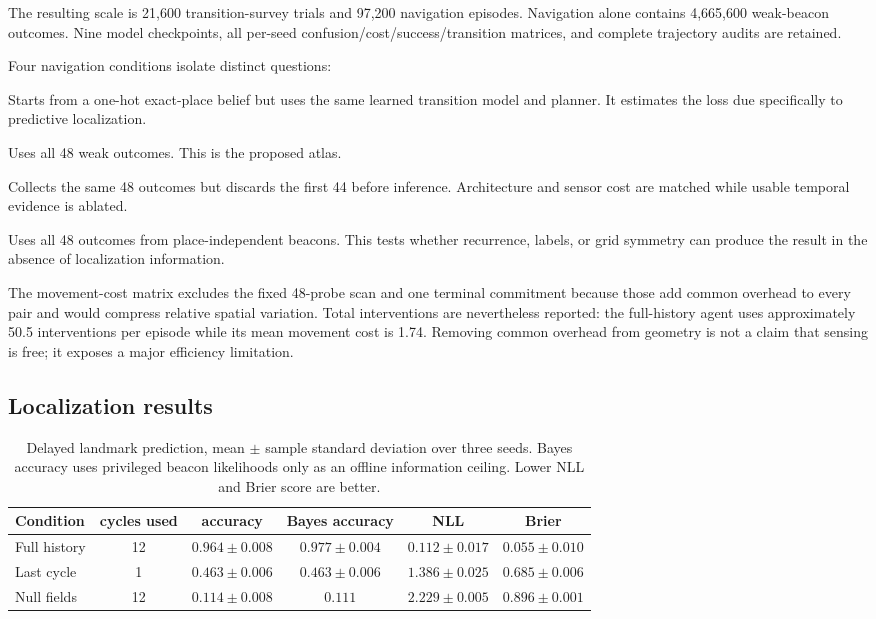 \documentclass[11pt]{article}
\begin{document}
The resulting scale is 21,600 transition-survey trials and 97,200 navigation
episodes. Navigation alone contains 4,665,600 weak-beacon outcomes. Nine model
checkpoints, all per-seed confusion/cost/success/transition matrices, and
complete trajectory audits are retained.

Four navigation conditions isolate distinct questions:
\begin{description}[style=nextline]
 \item[Online oracle] Starts from a one-hot exact-place belief but uses the same
 learned transition model and planner. It estimates the loss due specifically
 to predictive localization.
 \item[Full history] Uses all 48 weak outcomes. This is the proposed atlas.
 \item[Last cycle] Collects the same 48 outcomes but discards the first 44
 before inference. Architecture and sensor cost are matched while usable
 temporal evidence is ablated.
 \item[Null fields] Uses all 48 outcomes from place-independent beacons. This
 tests whether recurrence, labels, or grid symmetry can produce the result in
 the absence of localization information.
\end{description}

The movement-cost matrix excludes the fixed 48-probe scan and one terminal
commitment because those add common overhead to every pair and would compress
relative spatial variation. Total interventions are nevertheless reported:
the full-history agent uses approximately 50.5 interventions per episode while
its mean movement cost is 1.74. Removing common overhead from geometry is not a
claim that sensing is free; it exposes a major efficiency limitation.

\subsection{Localization results}

\begin{table}[t]
\centering
\caption{Delayed landmark prediction, mean $\pm$ sample standard deviation
over three seeds. Bayes accuracy uses privileged beacon likelihoods only as an
offline information ceiling. Lower NLL and Brier score are better.}
\label{tab:atlas-localization}
\small
\begin{tabular}{lccccc}
\toprule
Condition & cycles used & accuracy & Bayes accuracy & NLL & Brier\\
\midrule
Full history & 12 & $\mathbf{0.964\pm0.008}$ & $0.977\pm0.004$ & $0.112\pm0.017$ & $0.055\pm0.010$\\
Last cycle & 1 & $0.463\pm0.006$ & $0.463\pm0.006$ & $1.386\pm0.025$ & $0.685\pm0.006$\\
Null fields & 12 & $0.114\pm0.008$ & $0.111$ & $2.229\pm0.005$ & $0.896\pm0.001$\\
\bottomrule
\end{tabular}
\end{table}
\end{document}
